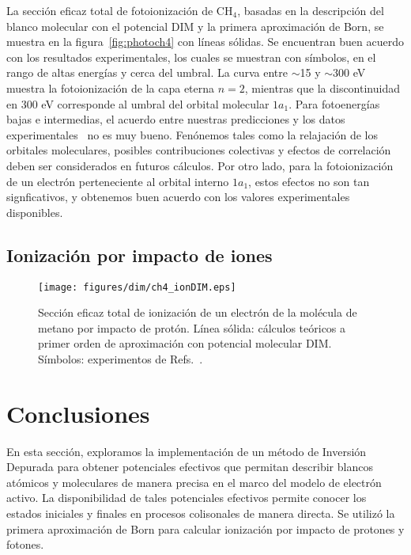 La sección eficaz total de fotoionización de CH$_4$, basadas en la 
descripción del blanco molecular con el potencial DIM y la primera 
aproximación de Born, se muestra en la figura~\ref{fig:photoch4} con 
líneas sólidas. Se encuentran buen acuerdo con los resultados 
experimentales, los cuales se muestran con símbolos, en el rango de
altas energías y cerca del umbral. La curva entre $\sim$15 y 
$\sim$300 eV muestra la fotoionización de la capa eterna $n=2$, mientras
que la discontinuidad en 300 eV corresponde al umbral del orbital 
molecular $1a_1$. Para fotoenergías bajas e intermedias, el acuerdo entre 
nuestras predicciones y los datos 
experimentales~\cite{Lukirskii:64,Henke:82,Samson:89} no es muy bueno.
Fenónemos tales como la relajación de los orbitales moleculares, posibles
contribuciones colectivas y efectos de correlación deben ser considerados 
en futuros cálculos. Por otro lado, para la fotoionización de un electrón
perteneciente al orbital interno $1a_1$, estos efectos no son tan 
signficativos, y obtenemos buen acuerdo con los valores experimentales
disponibles.

\subsection{Ionización por impacto de iones}

\begin{figure}
\centering
 \texttt{[image: figures/dim/ch4\_ionDIM.eps]}
\caption[Ionización de metano por impacto de protón.]
{Sección eficaz total de ionización de un electrón de la
molécula de metano por impacto de protón. Línea sólida: cálculos 
teóricos a primer orden de aproximación con potencial molecular DIM. 
Símbolos: experimentos de Refs.~\cite{Rudd:83,Rudd:85}.}
\label{fig:ionch4}
\end{figure}

\newpage
\section{Conclusiones}
\label{conclusion}

En esta sección, exploramos la implementación de un método de Inversión
Depurada para obtener potenciales efectivos que permitan describir
blancos atómicos y moleculares de manera precisa en el marco del modelo 
de electrón activo. La disponibilidad de tales potenciales efectivos 
permite conocer los estados iniciales y finales en procesos colisonales 
de manera directa. Se utilizó la primera aproximación de Born para 
calcular ionización por impacto de protones y fotones. 


